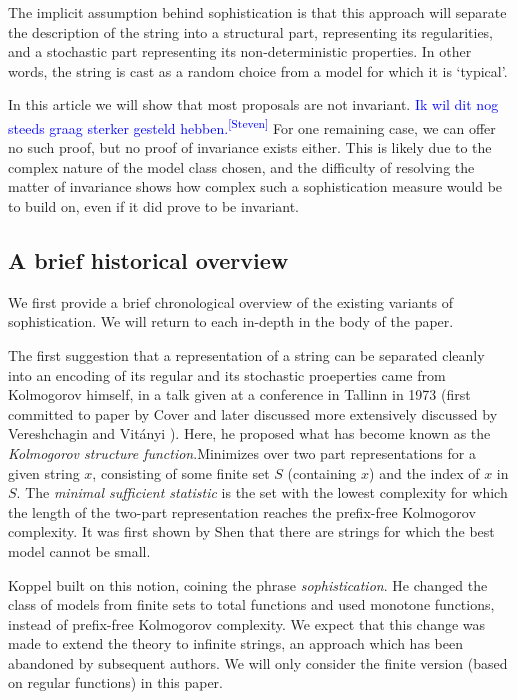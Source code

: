 \documentclass{style/llncs}
\newcommand{\sdr}[1]{\textcolor{blue}{\small #1\textsuperscript{[Steven]} }}
\begin{document}
The implicit assumption behind sophistication is that this approach will separate the description of the string into a structural part, representing its regularities, and a stochastic part representing its non-deterministic properties. In other words, the string is cast as a random choice from a model for which it is `typical'.  

In this article we will show that most proposals are not invariant. \sdr{Ik wil dit nog steeds graag sterker gesteld hebben.} For one remaining case, we can offer no such proof, but no proof of invariance exists either. This is likely due to the complex nature of the model class chosen, and the difficulty of resolving the matter of invariance shows how complex such a sophistication measure would be to build on, even if it did prove to be invariant.

\subsection{A brief historical overview}

We first provide a brief chronological overview of the existing variants of sophistication. We will return to each in-depth in the body of the paper. 

The first suggestion that a representation of a string can be separated cleanly into an encoding of its regular and its stochastic proeperties came from Kolmogorov himself, in a talk given at a conference in Tallinn in 1973 (first committed to paper by Cover \cite{cover1985kolmogorov} and later discussed more extensively discussed by Vereshchagin and Vit\'anyi \cite{vereshchagin2004kolmogorov}). Here, he proposed what has become known as the \emph{Kolmogorov structure function}.Minimizes over two part representations for a given string $x$, consisting of some finite set $S$ (containing $x$) and the index of $x$ in $S$. The \emph{minimal sufficient statistic} is the set with the lowest complexity for which the length of the two-part representation reaches the prefix-free Kolmogorov complexity. It was first shown by Shen \cite{shen1983concept} that there are strings for which the best model cannot be small.

Koppel \cite{koppelSoph1988,koppel1991almost} built on this notion, coining the phrase \emph{sophistication}. He changed the class of models from finite sets to total functions and used monotone functions, instead of prefix-free Kolmogorov complexity. We expect that this change was made to extend the theory to infinite strings, an approach which has been abandoned by subsequent authors. We will only consider the finite version (based on regular functions) in this paper.
\end{document}
